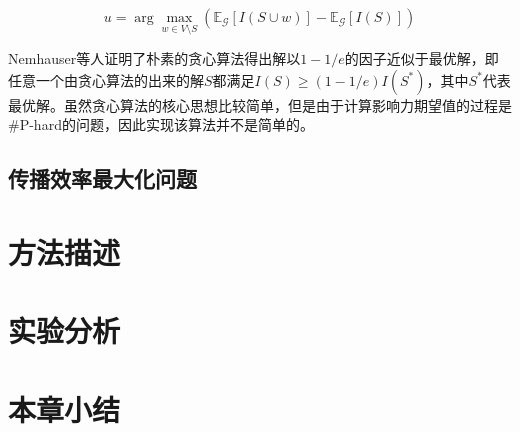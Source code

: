 \begin{equation}\label{eq:greedyIM}
    u=\arg\max\limits_{w \in V \setminus S}\left({\mathbb{E}_\mathcal{G}\left[I\left(S\cup w\right)\right]-\mathbb{E}_\mathcal{G}\left[I\left(S\right)\right]}\right)
\end{equation}

Nemhauser等人证明了朴素的贪心算法得出解以$1-1/e$的因子近似于最优解，即任意一个由贪心算法的出来的解$S$都满足$I\left(S\right) \geq (1-1/e) I\left(S^{\ast}\right)$，其中$S^{\ast}$代表最优解。虽然贪心算法的核心思想比较简单，但是由于计算影响力期望值的过程是\#P-hard的问题，因此实现该算法并不是简单的。

\subsection{传播效率最大化问题}
\label{3subsec:efficiency}

\section{方法描述}
\label{3sec:method}

\section{实验分析}
\label{3sec:experiment}

\section{本章小结}
\label{3sec:conclusion}

